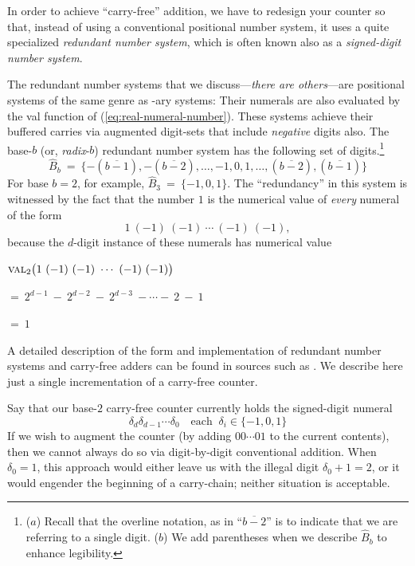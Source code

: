 In order to achieve ``carry-free'' addition, we have to redesign your
counter so that, instead of using a conventional positional number
system, it uses a quite specialized {\it redundant number system},
 which is often known also as a {\it
  signed-digit number system}.  

The redundant number systems that we discuss---{\em there are
  others}---are positional systems of the same genre as -ary systems:
Their numerals are also evaluated by the {\sc val} function of
(\ref{eq:real-numeral-number}).  These systems achieve their buffered
carries via augmented digit-sets that include {\em negative} digits
also.  The base-$b$ (or, {\it radix}-$b$) redundant number system
  has the following set of digits.\footnote{($a$)
  Recall that the overline notation, as in ``$\overline{b-2}$'' is to
  indicate that we are referring to a single digit.  ($b$) We add
  parentheses when we describe $\widehat{B}_b$ to enhance legibility.}
\[ \widehat{B}_b \ = \ \{-(\overline{b-1}), -(\overline{b-2}), \ldots,
-1, 0 , 1, \ldots, (\overline{b-2}), (\overline{b-1})\}
\]
For base $b=2$, for example, $\widehat{B}_3 \ = \ \{ -1, 0, 1\}$.  The
``redundancy'' in this system is witnessed by the fact that the number
$1$ is the numerical value of {\em every} numeral of the form
\[ 1 \ (-1) \ (-1) \ \cdots \ (-1) \ (-1), \]
because the $d$-digit instance of these numerals has numerical value

$\displaystyle \mbox{\sc val}_2 \big( 1 \ (-1) \ (-1) \ \cdots \ (-1) \ (-1) \big)$

\smallskip

\hspace*{.25in}$= \ 2^{d-1} \ - \ 2^{d-2} \ - \ 2^{d-3} \ - \cdots - \ 2 \ - \ 1$

\hspace*{.25in}$= \ 1$

\medskip

A detailed description of the form and implementation of redundant
number systems and carry-free adders can be found in sources such as
\cite{Hwang79}.  We describe here just a single incrementation of a
carry-free counter.

Say that our base-$2$ carry-free counter currently holds the
signed-digit numeral
\[ \delta_d \delta_{d-1} \cdots \delta_0 \ \ \ \mbox{ each }
\ \delta_i \in \{-1, 0, 1\}
\]
If we wish to augment the counter (by adding $00 \cdots 01$ to the
current contents), then we cannot always do so via digit-by-digit
conventional addition.  When $\delta_0 = 1$, this approach would
either leave us with the illegal digit $\delta_0 + 1 =2$, or it would
engender the beginning of a carry-chain; neither situation is
acceptable.

